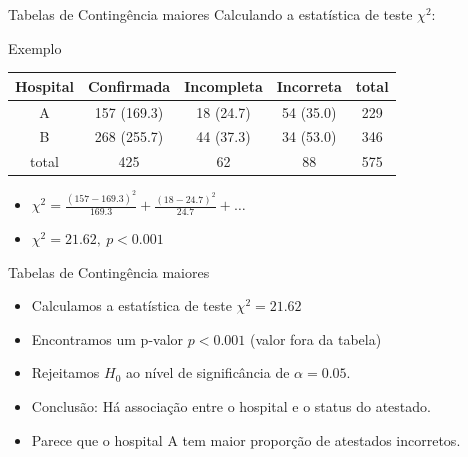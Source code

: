 \documentclass{beamer}
\begin{document}
\begin{frame}{Tabelas de Contingência maiores}
  \small
  Calculando a estatística de teste $\chi^2$:

  \bigskip
  \begin{exampleblock}{Exemplo}
    \begin{tabular}{c|c|c|c|c}
      \footnotesize
      Hospital & Confirmada & Incompleta &
      Incorreta & total\\
      \hline
      A & 157 (169.3) & 18 (24.7) & 54 (35.0) & 229\\
      \hline
      B & 268 (255.7) & 44 (37.3) & 34 (53.0) & 346\\
      \hline
      total & 425 & 62 & 88 & 575\\
    \end{tabular}
  \end{exampleblock}
  \begin{itemize}
    \scriptsize
  \item $\chi^2 = \frac{(157 - 169.3)^2}{169.3} + \frac{(18-24.7)^2}{24.7}  + \ldots$
    \bigskip
    \small
  \item $\chi^2 = 21.62,\ p<0.001$
  \end{itemize}
\end{frame}

\begin{frame}{Tabelas de Contingência maiores}
  \begin{itemize}
  \item Calculamos a estatística de teste $\chi^2 = 21.62$
  \item Encontramos um p-valor $p<0.001$ (valor fora da tabela)
  \item Rejeitamos $H_0$ ao nível de significância de $\alpha = 0.05$.
  \item Conclusão: Há associação entre o hospital e o status do atestado.
  \item Parece que o hospital A tem maior proporção de atestados incorretos.
  \end{itemize}
\end{frame}



\end{document}
